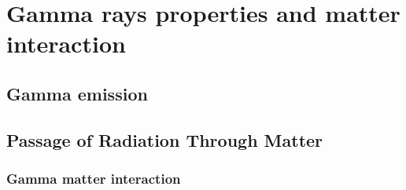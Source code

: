 
\chapter{Gamma rays properties and matter interaction}


\section{Gamma emission}
\section{Passage of Radiation Through Matter}
\subsection{Gamma matter interaction}





